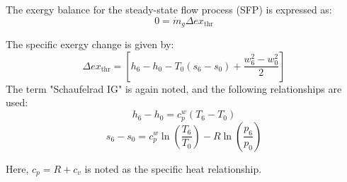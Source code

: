 The exergy balance for the steady-state flow process (SFP) is expressed as:  
\[
0 = \dot{m}_g \Delta ex_{\text{thr}}
\]  

The specific exergy change is given by:  
\[
\Delta ex_{\text{thr}} = \left[ h_6 - h_0 - T_0 (s_6 - s_0) + \frac{w_6^2 - w_0^2}{2} \right]
\]  
The term "Schaufelrad IG" is again noted, and the following relationships are used:  
\[
h_6 - h_0 = c_p^w (T_6 - T_0)
\]  
\[
s_6 - s_0 = c_p^w \ln \left( \frac{T_6}{T_0} \right) - R \ln \left( \frac{p_6}{p_0} \right)
\]  

Here, \( c_p = R + c_v \) is noted as the specific heat relationship.